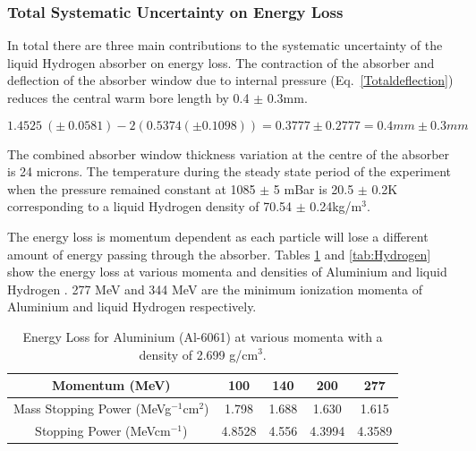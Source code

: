 \subsubsection{Total Systematic Uncertainty on Energy Loss}
\label{SubSect:Absorber_total}

In total there are three main contributions to the systematic uncertainty of the liquid Hydrogen absorber on energy loss. The contraction of the absorber and deflection of the absorber window due to internal pressure (Eq.~\ref{Totaldeflection}) reduces the central warm bore length by 0.4 $\mathrm{\pm}$ 0.3mm.

\begin{equation}
    1.4525\ \left(\pm \ 0.0581\right)-2\left(0.5374\left(\pm 0.1098\right)\right)=0.3777\pm 0.2777=0.4mm\pm 0.3mm
\label{Totaldeflection}    
\end{equation}

The combined absorber window thickness variation at the centre of the absorber is 24 microns. The temperature during the steady state period of the experiment when the pressure remained constant at 1085 $\mathrm{\pm}$ 5 mBar is 20.5 $\mathrm{\pm}$ 0.2K corresponding to a liquid Hydrogen density of 70.54 $\mathrm{\pm}$ 0.24kg/m${}^{3}$.

The energy loss is momentum dependent as each particle will lose a different amount of energy passing through the absorber. Tables \ref{tab:Aluminium} and \ref{tab:Hydrogen} show the energy loss at various momenta and densities of Aluminium and liquid Hydrogen \cite{AtomicAluminium} \cite{AtomicHydrogen} \cite{MuonAluminium} \cite{MuonliquidHydrogen}. 277 MeV and 344 MeV are the minimum ionization momenta of Aluminium and liquid Hydrogen respectively.


\begin{table}[h]
  \caption{
    Energy Loss for Aluminium (Al-6061) at various momenta with a density of 2.699 g/cm${}^{3}$.
  }
  \label{tab:Aluminium}
  \begin{center}
    \begin{tabular}{|c c c c c|}
    \hline

Momentum (MeV) & 100 & 140 & 200 & 277     \rule{0pt}{14pt} \\
\hline
{Mass Stopping Power (MeVg${}^{-1}$cm${}^{2}$)} & 1.798 & 1.688 & 1.630 & 1.615
\\
{Stopping Power (MeVcm${}^{-1}$)} & 4.8528 & 4.556 & 4.3994 & 4.3589
\\

    \hline
    \end{tabular}
  \end{center}
\end{table} 

